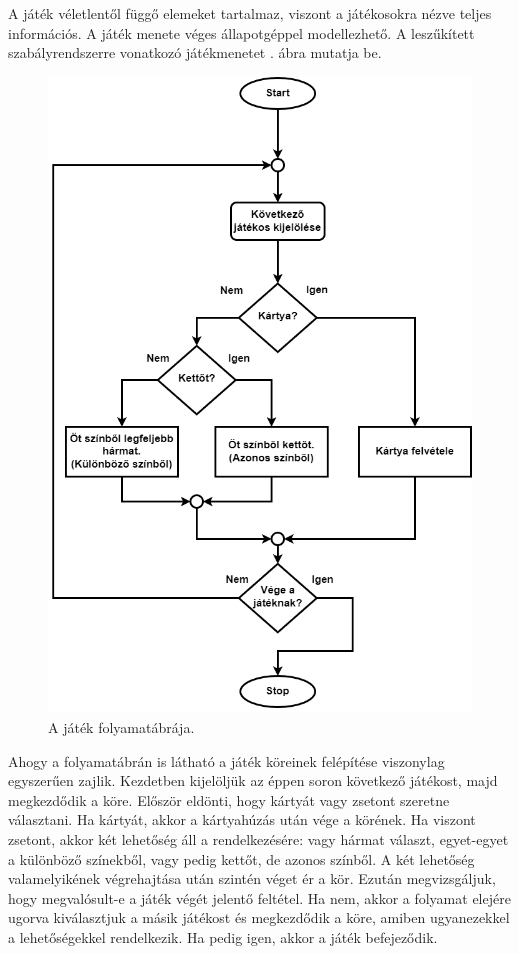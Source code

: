 
A játék véletlentől függő elemeket tartalmaz, viszont a játékosokra nézve teljes információs. A játék menete véges állapotgéppel modellezhető. A leszűkített szabályrendszerre vonatkozó játékmenetet . ábra mutatja be.

\begin{figure}[h]
\centering
\includegraphics[scale=0.42]{images/flowchart.png}
\caption{A játék folyamatábrája.}
\label{fig:flowchart}
\end{figure}

Ahogy a folyamatábrán is látható a játék köreinek felépítése viszonylag egyszerűen zajlik. Kezdetben kijelöljük az éppen soron következő játékost, majd megkezdődik a köre. Először eldönti, hogy kártyát vagy zsetont szeretne választani. Ha kártyát, akkor a kártyahúzás után vége a körének. Ha viszont zsetont, akkor két lehetőség áll a rendelkezésére: vagy hármat választ, egyet-egyet a különböző színekből, vagy pedig kettőt, de azonos színből. A két lehetőség valamelyikének végrehajtása után szintén véget ér a kör. Ezután megvizsgáljuk, hogy megvalósult-e a játék végét jelentő feltétel. Ha nem, akkor a folyamat elejére ugorva kiválasztjuk a másik játékost és megkezdődik a köre, amiben ugyanezekkel a lehetőségekkel rendelkezik. Ha pedig igen, akkor a játék befejeződik.

